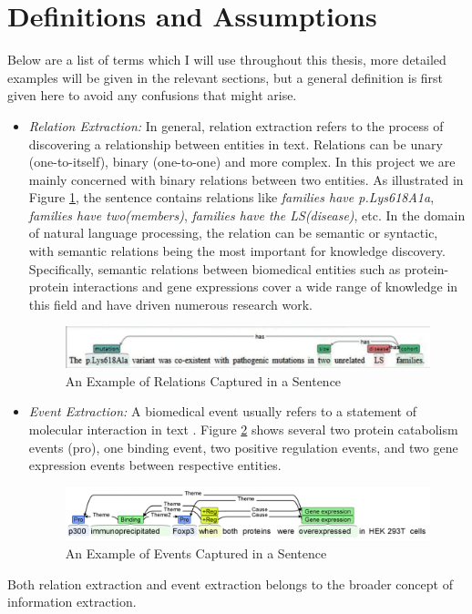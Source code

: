 \section{Definitions and Assumptions}\label{section1.2}%
Below are a list of terms which I will use throughout this thesis, more detailed examples will be given in the relevant sections, but a general definition is first given here to avoid any confusions that might arise.
\begin{itemize}
	\item \emph{Relation Extraction:} In general, relation extraction refers to the process of discovering a relationship between entities in text. Relations can be unary (one-to-itself), binary (one-to-one) and more complex\cite{mcdonald2005simple}. In this project we are mainly concerned with binary relations between two entities. As illustrated in Figure \ref{fig:Relations_Example}, the sentence contains relations like \emph{families have p.Lys618A1a}, \emph{families have two(members)}, \emph{families have the LS(disease)}, etc. In the domain of natural language processing, the relation can be semantic or syntactic, with semantic relations being the most important for knowledge discovery. Specifically, semantic relations between biomedical entities such as protein-protein interactions and gene expressions cover a wide range of knowledge in this field and have driven numerous research work.
	\begin{figure}
		\centering
		\includegraphics[width=\textwidth]{Relations_Example}
		\caption{An Example of Relations Captured in a Sentence}
		\label{fig:Relations_Example}   
	\end{figure}
	\item \emph{Event Extraction:} A biomedical event usually refers to a statement of molecular interaction in text \cite{bjorne2011generalizing}. Figure \ref{fig:Events_Example} shows several two protein catabolism events (pro), one binding event, two positive regulation events, and two gene expression events between respective entities.
	\begin{figure}
		\centering
		\includegraphics[width=\textwidth]{Events_Example}
		\caption{An Example of Events Captured in a Sentence}
		\label{fig:Events_Example}   
	\end{figure}
\end{itemize}
Both relation extraction and event extraction belongs to the broader concept of information extraction.

